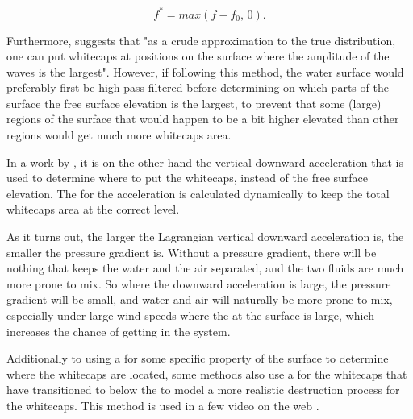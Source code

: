 \begin{equation}
f^* = max(f-f_0,\,0).
\end{equation}

Furthermore, \citeauthor{Premovze2001} suggests that "as a crude approximation to the true distribution, one can put whitecaps at positions on the surface where the amplitude of the waves is the largest". However, if following this method, the water surface would preferably first be high-pass filtered before determining on which parts of the surface the free surface elevation is the largest, to prevent that some (large) regions of the surface that would happen to be a bit higher elevated than other regions would get much more whitecaps area.

In a work by \citet{Monnier}, it is on the other hand the vertical downward acceleration that is used to determine where to put the whitecaps, instead of the free surface elevation. The \threshold for the acceleration is calculated dynamically to keep the total whitecaps area at the correct level. 

As it turns out, the larger the Lagrangian vertical downward acceleration is, the smaller the pressure gradient is. Without a pressure gradient, there will be nothing that keeps the water and the air separated, and the two fluids are much more prone to mix. So where the downward acceleration is large, the pressure gradient will be small, and water and air will naturally be more prone to mix, especially under large wind speeds where the  at the surface is large, which increases the chance of getting  in the system.

Additionally to using a \threshold for some specific property of the surface to determine where the whitecaps are located, some methods also use a  for the whitecaps that have transitioned to below the \threshold to model a more realistic destruction process for the whitecaps. This method is used in a few video on the web \citep{ozernik2009,cebasVT2010}.

